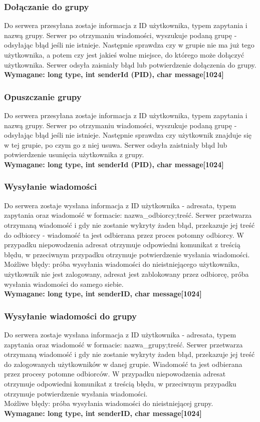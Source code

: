 \documentclass[11pt]{article}
\begin{document}
	\subsubsection{Dołączanie do grupy}
	Do serwera przesyłana zostaje informacja z ID użytkownika, typem zapytania i nazwą grupy. Serwer po otrzymaniu wiadomości, wyszukuje podaną grupę - odsyłając błąd jeśli nie istnieje. Następnie sprawdza czy w grupie nie ma już tego użytkownika, a potem czy jest jakieś wolne miejsce, do którego może dołączyć użytkownika. Serwer odsyła zaisniały błąd lub potwierdzenie dołączenia do grupy.\\
	\textbf{Wymagane: long type, int senderId (PID), char message[1024]}
	\subsubsection{Opuszczanie grupy}
	Do serwera przesyłana zostaje informacja z ID użytkownika, typem zapytania i nazwą grupy. Serwer po otrzymaniu wiadomości, wyszukuje podaną grupę - odsyłając błąd jeśli nie istnieje. Następnie sprawdza czy użytkownik znajduje się w tej grupie, po czym go z niej usuwa. Serwer odsyła zaistniały błąd lub potwierdzenie usunięcia użytkownika z grupy.\\
	\textbf{Wymagane: long type, int senderId (PID), char message[1024]}
	\subsubsection{Wysyłanie wiadomości}
	Do serwera zostaje wysłana informacja z ID użytkownika - adresata, typem zapytania oraz wiadomość w formacie: nazwa\_odbiorcy;treść. Serwer przetwarza otrzymaną wiadomość i gdy nie zostanie wykryty żaden błąd, przekazuje jej treść do odbiorcy - wiadomość ta jest odbierana przez proces potomny odbiorcy. W przypadku niepowodzenia adresat otrzymuje odpowiedni komunikat z treścią błędu, w przeciwnym przypadku otrzymuje potwierdzenie wysłania wiadomości.\\
	Możliwe błędy: próba wysyłania wiadomości do nieistniejącego użytkownika, użytkownik nie jest zalogowany, adresat jest zablokowany przez odbiorcę, próba wysłania wiadomości do samego siebie.\\
	\textbf{Wymagane: long type, int senderID, char message[1024]}
	\subsubsection{Wysyłanie wiadomości do grupy}
	Do serwera zostaje wysłana informacja z ID użytkownika - adresata, typem zapytania oraz wiadomość w formacie: nazwa\_grupy;treść. Serwer przetwarza otrzymaną wiadomość i gdy nie zostanie wykryty żaden błąd, przekazuje jej treść do zalogowanych użytkowników w danej grupie. Wiadomość ta jest odbierana przez procesy potomne odbiorców.  W przypadku niepowodzenia adresat otrzymuje odpowiedni komunikat z treścią błędu, w przeciwnym przypadku otrzymuje potwierdzenie wysłania wiadomości.\\
	Możliwe błędy: próba wysyłania wiadomości do nieistniejącej grupy.\\
	\textbf{Wymagane: long type, int senderID, char message[1024]}
\end{document}
